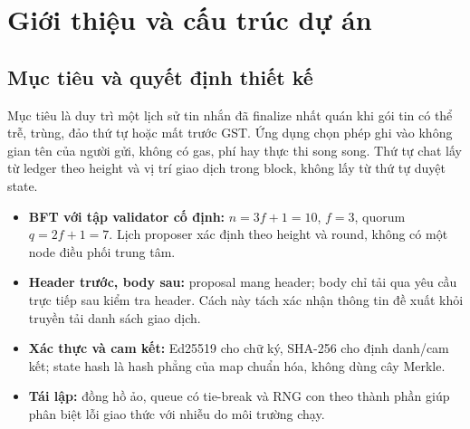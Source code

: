 \documentclass[11pt,a4paper]{article}
\newcommand{\code}[1]{\texttt{\detokenize{#1}}}
\newcommand{\key}[1]{\textbf{\color{navy}#1}}
\begin{document}
\hypersetup{pageanchor=false}

\hypersetup{pageanchor=true}

\clearpage
{}
\pagestyle{fancy}
\section{Giới thiệu và cấu trúc dự án}
\subsection{Mục tiêu và quyết định thiết kế}
Mục tiêu là duy trì một lịch sử tin nhắn đã finalize nhất quán khi gói tin có thể trễ, trùng, đảo thứ tự hoặc mất trước GST. Ứng dụng chọn phép ghi \code{SET} vào không gian tên của người gửi, không có gas, phí hay thực thi song song. Thứ tự chat lấy từ ledger theo height và vị trí giao dịch trong block, không lấy từ thứ tự duyệt state.

\begin{itemize}
\item \key{BFT với tập validator cố định:} $n=3f+1=10$, $f=3$, quorum $q=2f+1=7$. Lịch proposer xác định theo height và round, không có một node điều phối trung tâm.
\item \key{Header trước, body sau:} proposal mang header; body chỉ tải qua yêu cầu trực tiếp sau kiểm tra header. Cách này tách xác nhận thông tin đề xuất khỏi truyền tải danh sách giao dịch.
\item \key{Xác thực và cam kết:} Ed25519 cho chữ ký, SHA-256 cho định danh/cam kết; state hash là hash phẳng của map chuẩn hóa, không dùng cây Merkle.
\item \key{Tái lập:} đồng hồ ảo, queue có tie-break và RNG con theo thành phần giúp phân biệt lỗi giao thức với nhiễu do môi trường chạy.
\end{itemize}
\end{document}
